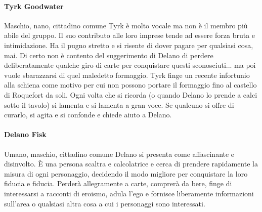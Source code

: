 \documentclass{article}
\begin{document}
\paragraph{Tyrk Goodwater} Maschio, nano, cittadino comune
Tyrk è molto vocale ma non è il membro più abile del gruppo. Il suo contributo alle loro imprese tende ad essere forza bruta e intimidazione. Ha il pugno stretto e si risente di dover pagare per qualsiasi cosa, mai. Di certo non è contento del suggerimento di Delano di perdere deliberatamente qualche giro di carte per conquistare questi sconosciuti... ma poi vuole sbarazzarsi di quel maledetto formaggio.
Tyrk finge un recente infortunio alla schiena come motivo per cui non possono portare il formaggio fino al castello di Roquefort da soli. Ogni volta che si ricorda (o quando Delano lo prende a calci sotto il tavolo) si lamenta e si lamenta a gran voce. Se qualcuno si offre di curarlo, si agita e si confonde e chiede aiuto a Delano.



\paragraph{Delano Fisk}Umano, maschio, cittadino comune
Delano si presenta come affascinante e disinvolto. È una persona scaltra e calcolatrice e cerca di prendere rapidamente la misura di ogni personaggio, decidendo il modo migliore per conquistare la loro fiducia e fiducia.
Perderà allegramente a carte, comprerà da bere, finge di interessarsi a racconti di eroismo, adula l'ego e fornisce liberamente informazioni sull'area o qualsiasi altra cosa a cui i personaggi sono interessati.
\end{document}
